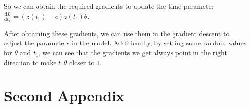 \documentclass[a4paper,11pt,titlepage]{article}
\theoremstyle{definition}
\theoremstyle{plain}
\theoremstyle{remark}
\begin{document}
So we can obtain the required gradients to update the time parameter $\frac{\mathrm{d}L}{\mathrm{d}t_1}=(z(t_1)-c)z(t_1)\theta$.

After obtaining these gradients, we can use them in the gradient descent to adjust the parameters in the model. Additionally, by setting some random values for $\theta$ and $t_1$, we can see that the gradients we get always point in the right direction to make $t_1\theta$ closer to $1$.
\label{appendix 1}
\pagebreak
\section{Second Appendix}

\pagebreak

\end{document}
